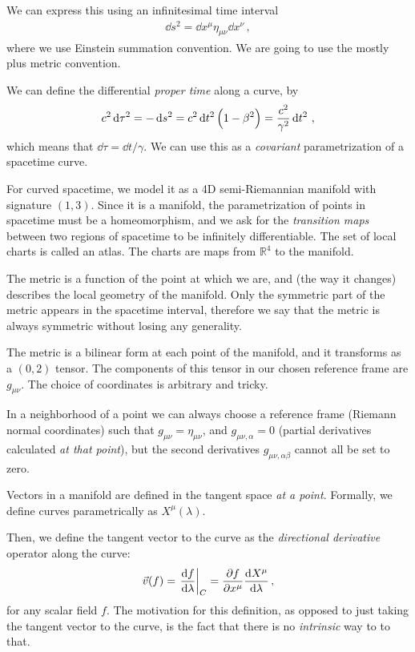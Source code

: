 \documentclass[main.tex]{subfiles}
\begin{document}
We can express this using an infinitesimal time interval  
%
\begin{align}
\dd{s^2} = \dd{x^{\mu }} \eta_{\mu \nu  } \dd{x^{\nu }}
\,,
\end{align}
%
where we use Einstein summation convention. 
We are going to use the mostly plus metric convention. 

We can define the differential \emph{proper time} along a curve, by 
%
\begin{align}
c^2 \dd{\tau^2}  = - \dd{s^2} = c^2 \dd{t^2} \qty(1 - \beta^2) = \frac{c^2}{\gamma^2} \dd{t^2}
\,,
\end{align}
%
which means that \(\dd{\tau } = \dd{t} / \gamma \). 
We can use this as a \emph{covariant} parametrization of a spacetime curve. 

For curved spacetime, we model it as a 4D semi-Riemannian manifold with signature \((1, 3)\). 
Since it is a manifold, the parametrization of points in spacetime must be a homeomorphism, and we ask for the \emph{transition maps} between two regions of spacetime to be infinitely differentiable. 
The set of local charts is called an atlas. 
The charts are maps from \(\mathbb{R}^{4}\) to the manifold. 

The metric is a function of the point at which we are, and (the way it changes) describes the local geometry of the manifold. 
Only the symmetric part of the  metric appears in the spacetime interval, therefore we say that the metric is always symmetric without losing any generality. 

The metric is a bilinear form at each point of the manifold, and it transforms as a \((0,2)\) tensor. 
The components of this tensor in our chosen reference frame are \(g_{\mu \nu }\). 
The choice of coordinates is arbitrary and tricky. 

In a neighborhood of a point we can always choose a reference frame (Riemann normal coordinates) such that \(g_{\mu \nu } = \eta_{\mu \nu }\), and \(g_{\mu \nu , \alpha } = 0\) (partial derivatives calculated \emph{at that point}), but the second derivatives \(g_{\mu \nu , \alpha \beta }\) cannot all be set to zero. 

Vectors in a manifold are defined in the tangent space \emph{at a point}. 
Formally, we define curves parametrically as \(X^{\mu }(\lambda )\). 

Then, we define the tangent vector to the curve as the \emph{directional derivative} operator along the curve: 
%
\begin{align}
\vec{v} (f) = \eval{\dv{f}{\lambda }}_{C} = \pdv{f}{x^{\mu }} \dv{X^{\mu }}{\lambda }
\,,
\end{align}
%
for any scalar field \(f\). The motivation for this definition, as opposed to just taking the tangent vector to the curve, is the fact that there is no \emph{intrinsic} way to to that. 
\end{document}
